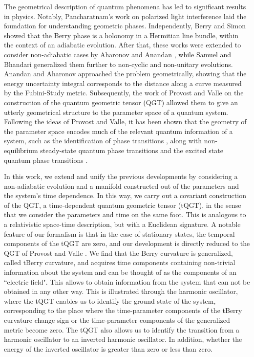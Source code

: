 \documentclass[12pt]{iopart}
\begin{document}
The geometrical description of quantum phenomena has led to significant results in physics. Notably, Pancharatnam's work on polarized light interference \cite{Pancha} laid the foundation for understanding geometric phases. Independently, Berry \cite{Berry1984} and Simon \cite{Simon} showed that the Berry phase is a holonomy in a Hermitian line bundle, within the context of an adiabatic evolution. After that, these works were extended to consider non-adiabatic cases by Aharonov and Anandan \cite{AA1, AA2}, while Samuel and Bhandari \cite{Samuel, Samuel1} generalized them further to non-cyclic and non-unitary evolutions. Anandan and Aharonov \cite{AA3} approached the problem geometrically, showing that the energy uncertainty integral corresponds to the distance along a curve measured by the Fubini-Study metric. Subsequently, the work of Provost and Valle \cite{Provost} on the construction of the quantum geometric tensor (QGT) allowed them to give an utterly geometrical structure to the parameter space of a quantum system. Following the ideas of Provost and Valle, it has been shown that the geometry of the parameter space encodes much of the relevant quantum information of a system, such as the identification of phase transitions \cite{Zanardi2007Information, Carollo2020, Sarkar2012, Gonzalez2020}, along with non-equilibrium steady-state quantum phase transitions \cite{Tong, Marmo} and the excited state quantum phase transitions \cite{Leyvraz, Caprio}. 

In this work, we extend and unify the previous developments by considering a non-adiabatic evolution and a manifold constructed out of the parameters and the system's time dependence. In this way, we carry out a covariant construction of the QGT, a time-dependent quantum geometric tensor (tQGT), in the sense that we consider the parameters and time on the same foot. This is analogous to a relativistic space-time description, but with a Euclidean signature. A notable feature of our formalism is that in the case of stationary states, the temporal components of the tQGT are zero, and our development is directly reduced to the QGT of Provost and Valle \cite{Provost}. We find that the Berry curvature is generalized, called tBerry curvature, and acquires time components containing non-trivial information about the system and can be thought of as the components of an ``electric field".
This allows to obtain information from the system that can not be obtained in any other way. This is illustrated through the harmonic oscillator, where the tQGT enables us to identify the ground state of the system, corresponding to the place where the time-parameter components of the tBerry curvature change sign or the time-parameter components of the generalized metric become zero. The tQGT also allows us to identify the transition from a harmonic oscillator to an inverted harmonic oscillator. In addition, whether the energy of the inverted oscillator is greater than zero or less than zero. 
\end{document}
